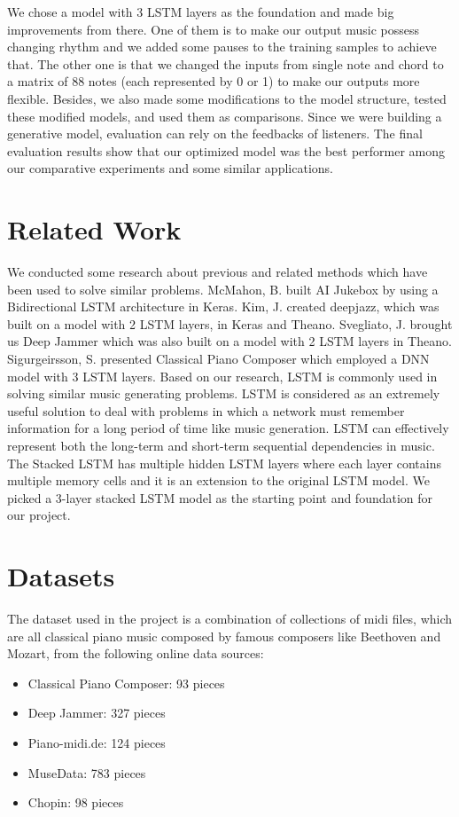 \documentclass[conference]{IEEEtran}
\begin{document}
We chose a model with 3 LSTM layers as the foundation and made big improvements from there. One of them is to make our output music possess changing rhythm and we added some pauses to the training samples to achieve that. The other one is that we changed the inputs from single note and chord to a matrix of 88 notes (each represented by 0 or 1) to make our outputs more flexible. Besides, we also made some modifications to the model structure, tested these modified models, and used them as comparisons. Since we were building a generative model, evaluation can rely on the feedbacks of listeners. The final evaluation results show that our optimized model was the best performer among our comparative experiments and some similar applications.   


\section{Related Work}

We conducted some research about previous and related methods which have been used to solve similar problems. McMahon, B. built AI Jukebox by using a Bidirectional LSTM architecture in Keras. Kim, J. created deepjazz, which was built on a model with 2 LSTM layers, in Keras and Theano. Svegliato, J. brought us Deep Jammer which was also built on a model with 2 LSTM layers in Theano. Sigurgeirsson, S. presented Classical Piano Composer which employed a DNN model with 3 LSTM layers. Based on our research, LSTM is commonly used in solving similar music generating problems. LSTM is considered as an extremely useful solution to deal with problems in which a network must remember information for a long period of time like music generation. LSTM can effectively represent both the long-term and short-term sequential dependencies in music. The Stacked LSTM has multiple hidden LSTM layers where each layer contains multiple memory cells and it is an extension to the original LSTM model. We picked a 3-layer stacked LSTM model as the starting point and foundation for our project. 

\section{Datasets}
The dataset used in the project is a combination of collections of midi files, which are all classical piano music composed by famous composers like Beethoven and Mozart, from the following online data sources:
\begin{itemize}
\item Classical Piano Composer: 93 pieces
\item Deep Jammer: 327 pieces
\item Piano-midi.de: 124 pieces
\item MuseData: 783 pieces
\item Chopin: 98 pieces
\end{itemize}
\end{document}
